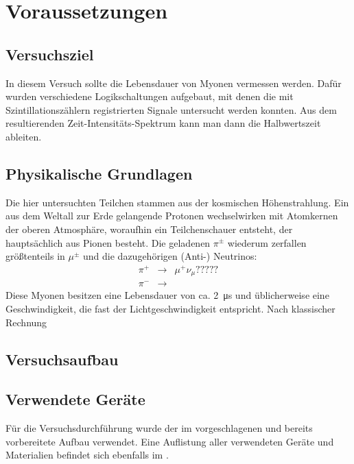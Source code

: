 \section{Voraussetzungen}

\subsection{Versuchsziel}

In diesem Versuch sollte die Lebensdauer von Myonen vermessen werden. Dafür
wurden verschiedene Logikschaltungen aufgebaut, mit denen die mit
Szintillationszählern registrierten Signale untersucht werden konnten. Aus dem
resultierenden Zeit-Intensitäts-Spektrum kann man dann die Halbwertszeit
ableiten.

\subsection{Physikalische Grundlagen}

Die hier untersuchten Teilchen stammen aus der kosmischen Höhenstrahlung. Ein
aus dem Weltall zur Erde gelangende Protonen wechselwirken mit Atomkernen der
oberen Atmosphäre, woraufhin ein Teilchenschauer entsteht, der hauptsächlich
aus Pionen besteht. Die geladenen $π^{\pm}$ wiederum zerfallen größtenteils in
$μ^{\pm}$ und die dazugehörigen (Anti-) Neutrinos:
\begin{eqnarray}
π^+ &\rightarrow& μ^+ ν_μ ?????\\
π^- &\rightarrow& 
\end{eqnarray}
Diese Myonen besitzen eine Lebensdauer von ca. \SI{2}{\micro\second} und
üblicherweise eine Geschwindigkeit, die fast der Lichtgeschwindigkeit
entspricht. Nach klassischer Rechnung
\subsection{Versuchsaufbau}



\subsection{Verwendete Geräte}

Für die Versuchsdurchführung wurde der im \cite{script} vorgeschlagenen und
bereits vorbereitete Aufbau verwendet. Eine Auflistung aller verwendeten
Geräte und Materialien befindet sich ebenfalls im \cite[Kap. 6]{script}.